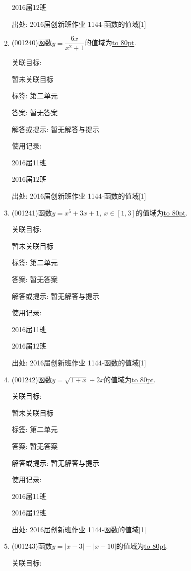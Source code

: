 \documentclass[10pt,a4paper]{article}
\newcommand{\blank}[1]{\underline{\hbox to #1pt{}}}
\begin{document}
\begin{enumerate}[1.]
2016届12班	


出处: 2016届创新班作业	1144-函数的值域[1]
\item { (001240)}函数$y=\dfrac{6x}{x^2+1}$的值域为\blank{80}.


关联目标:

暂未关联目标



标签: 第二单元

答案: 暂无答案

解答或提示: 暂无解答与提示

使用记录:

2016届11班	

2016届12班	


出处: 2016届创新班作业	1144-函数的值域[1]
\item { (001241)}函数$y=x^5+3x+1, \ x \in [1,3]$的值域为\blank{80}.


关联目标:

暂未关联目标



标签: 第二单元

答案: 暂无答案

解答或提示: 暂无解答与提示

使用记录:

2016届11班	

2016届12班	


出处: 2016届创新班作业	1144-函数的值域[1]
\item { (001242)}函数$y=\sqrt{1+x}+2x$的值域为\blank{80}.


关联目标:

暂未关联目标



标签: 第二单元

答案: 暂无答案

解答或提示: 暂无解答与提示

使用记录:

2016届11班	

2016届12班	


出处: 2016届创新班作业	1144-函数的值域[1]
\item { (001243)}函数$y=|x-3|-|x-10|$的值域为\blank{80}.


关联目标:


\end{enumerate}
\end{document}
